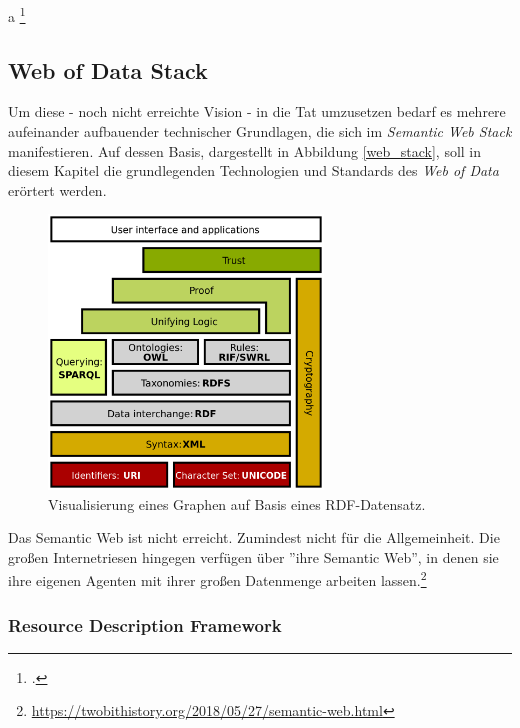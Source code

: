 \documentclass[12pt,a4paper]{article}
\begin{document}
a
\footcite[S.1-6]{pellegrini2006semantic}


\subsection{Web of Data Stack}

Um diese - noch nicht erreichte Vision - in die Tat umzusetzen bedarf es mehrere aufeinander aufbauender technischer Grundlagen, die sich im \textit{Semantic Web Stack} manifestieren. Auf dessen Basis, dargestellt in Abbildung \ref{web_stack}, soll in diesem Kapitel die grundlegenden Technologien und Standards des \textit{Web of Data} erörtert werden.
\begin{figure}[h]
  \centering
	\includegraphics[width=0.65\textwidth]{img/web_stack.png}  
    \caption[Visualisierung eines Graphen auf Basis eines RDF-Datensatz, \protect\url{https://www.w3.org/TR/rdf11-primer/}, 10.04.2019.]{Visualisierung eines Graphen auf Basis eines RDF-Datensatz.}
  	\label{fig:web_stack}
\end{figure}

Das Semantic Web ist nicht erreicht. Zumindest nicht für die Allgemeinheit. Die großen Internetriesen hingegen verfügen über ''ihre Semantic Web'', in denen sie ihre eigenen Agenten mit ihrer großen Datenmenge arbeiten lassen.\footnote{\url{https://twobithistory.org/2018/05/27/semantic-web.html}}




\subsubsection{Resource Description Framework}
\end{document}
